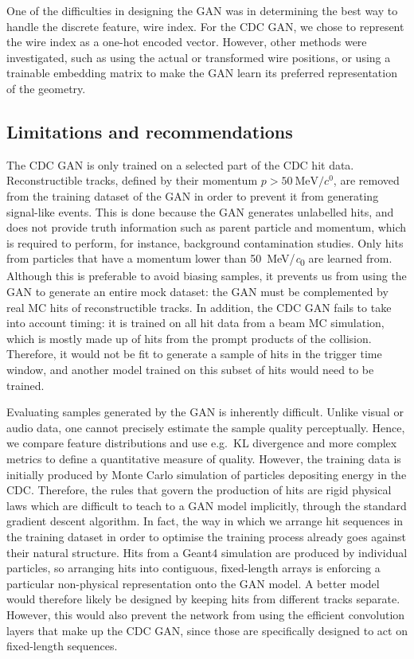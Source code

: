 
One of the difficulties in designing the GAN was in determining the best way
to handle the discrete feature, wire index. For the CDC GAN, we chose to
represent the wire index as a one-hot encoded vector. However, other methods
were investigated, such as using the actual or transformed wire positions, or
using a trainable embedding matrix to make the GAN learn its preferred
representation of the geometry.



\subsection{Limitations and recommendations}
The CDC GAN is only trained on a selected part of the CDC hit data.
Reconstructible tracks, defined by their momentum $p>\SI{50}{\MeV/\clight}$, are
removed from the training dataset of the GAN in order to prevent it from
generating signal-like events. This is done because the GAN generates unlabelled
hits, and does not provide truth information such as parent particle and
momentum, which is required to perform, for instance, background contamination
studies.
Only hits from particles that have a momentum lower than \SI{50}{\MeV/\clight}
are learned from. Although this is preferable to avoid biasing samples, it
prevents us from using the GAN to generate an entire mock dataset: the GAN must
be complemented by real MC hits of reconstructible tracks.
In addition, the CDC GAN fails to take into account timing: it is trained on all
hit data from a beam MC simulation, which is mostly made up of hits from the
prompt products of the collision. Therefore, it would not be fit to generate a
sample of hits in the trigger time window, and another model trained on this
subset of hits would need to be trained.

Evaluating samples generated by the GAN is inherently difficult. Unlike visual
or audio data, one cannot precisely estimate the sample quality perceptually.
Hence, we compare feature distributions and use e.g.\ KL divergence and more
complex metrics to define a quantitative measure of quality. However, the
training data is initially produced by Monte Carlo simulation of particles
depositing energy in the CDC. Therefore, the rules that govern the production of
hits are rigid physical laws which are difficult to teach to a GAN model
implicitly, through the standard gradient descent algorithm. In fact, the way in
which we arrange hit sequences in the training dataset in order to optimise the
training process already goes against their natural structure. Hits from a
Geant4 simulation are produced by individual particles, so arranging hits into
contiguous, fixed-length arrays is enforcing a particular non-physical
representation onto the GAN model. A better model would therefore likely be
designed by keeping hits from different tracks separate. However, this would
also prevent the network from using the efficient convolution layers that make
up the CDC GAN, since those are specifically designed to act on fixed-length
sequences. 

